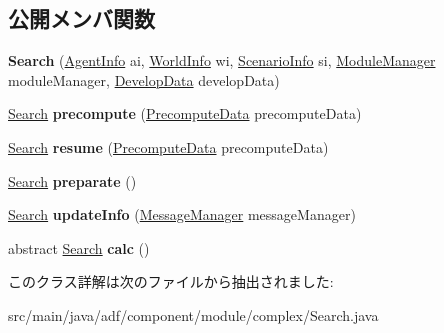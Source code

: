 \subsection*{公開メンバ関数}
\begin{DoxyCompactItemize}
\item 
\hypertarget{classadf_1_1component_1_1module_1_1complex_1_1Search_aa7f299fbbc683d487a38d7a9594463ab}{}\label{classadf_1_1component_1_1module_1_1complex_1_1Search_aa7f299fbbc683d487a38d7a9594463ab} 
{\bfseries Search} (\hyperlink{classadf_1_1agent_1_1info_1_1AgentInfo}{Agent\+Info} ai, \hyperlink{classadf_1_1agent_1_1info_1_1WorldInfo}{World\+Info} wi, \hyperlink{classadf_1_1agent_1_1info_1_1ScenarioInfo}{Scenario\+Info} si, \hyperlink{classadf_1_1agent_1_1module_1_1ModuleManager}{Module\+Manager} module\+Manager, \hyperlink{classadf_1_1agent_1_1develop_1_1DevelopData}{Develop\+Data} develop\+Data)
\item 
\hypertarget{classadf_1_1component_1_1module_1_1complex_1_1Search_a086ffb5b1d3930b32fac7680f1fea079}{}\label{classadf_1_1component_1_1module_1_1complex_1_1Search_a086ffb5b1d3930b32fac7680f1fea079} 
\hyperlink{classadf_1_1component_1_1module_1_1complex_1_1Search}{Search} {\bfseries precompute} (\hyperlink{classadf_1_1agent_1_1precompute_1_1PrecomputeData}{Precompute\+Data} precompute\+Data)
\item 
\hypertarget{classadf_1_1component_1_1module_1_1complex_1_1Search_a2d8c53328d34ae20581086900f96c8d6}{}\label{classadf_1_1component_1_1module_1_1complex_1_1Search_a2d8c53328d34ae20581086900f96c8d6} 
\hyperlink{classadf_1_1component_1_1module_1_1complex_1_1Search}{Search} {\bfseries resume} (\hyperlink{classadf_1_1agent_1_1precompute_1_1PrecomputeData}{Precompute\+Data} precompute\+Data)
\item 
\hypertarget{classadf_1_1component_1_1module_1_1complex_1_1Search_a2891cce13e95cec1868b290fbcca56d7}{}\label{classadf_1_1component_1_1module_1_1complex_1_1Search_a2891cce13e95cec1868b290fbcca56d7} 
\hyperlink{classadf_1_1component_1_1module_1_1complex_1_1Search}{Search} {\bfseries preparate} ()
\item 
\hypertarget{classadf_1_1component_1_1module_1_1complex_1_1Search_a5f31bb45c4b601bddfcccbb5e0b0c591}{}\label{classadf_1_1component_1_1module_1_1complex_1_1Search_a5f31bb45c4b601bddfcccbb5e0b0c591} 
\hyperlink{classadf_1_1component_1_1module_1_1complex_1_1Search}{Search} {\bfseries update\+Info} (\hyperlink{classadf_1_1agent_1_1communication_1_1MessageManager}{Message\+Manager} message\+Manager)
\item 
\hypertarget{classadf_1_1component_1_1module_1_1complex_1_1Search_ad6a3750f5501ffe8d69dcd361edebad0}{}\label{classadf_1_1component_1_1module_1_1complex_1_1Search_ad6a3750f5501ffe8d69dcd361edebad0} 
abstract \hyperlink{classadf_1_1component_1_1module_1_1complex_1_1Search}{Search} {\bfseries calc} ()
\end{DoxyCompactItemize}


このクラス詳解は次のファイルから抽出されました\+:\begin{DoxyCompactItemize}
\item 
src/main/java/adf/component/module/complex/Search.\+java\end{DoxyCompactItemize}

